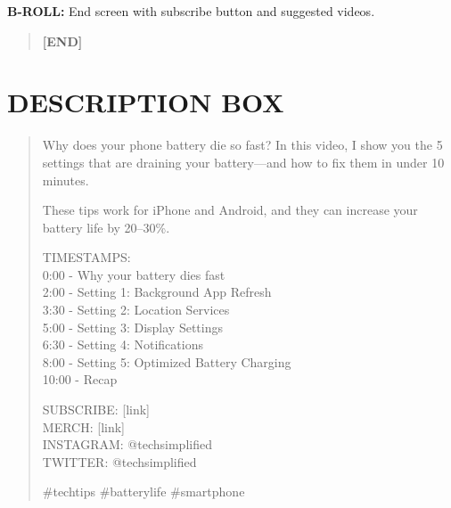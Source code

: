 \documentclass[
    language=english,
    doctype=video-script,
    institution=none,
]{../../omnilatex}
\begin{document}
\textbf{B-ROLL:} End screen with subscribe button and suggested videos.

\begin{quote}
\textbf{[END]}
\end{quote}

\section*{DESCRIPTION BOX}

\begin{quote}
Why does your phone battery die so fast? In this video, I show you the 5 settings that are draining your battery---and how to fix them in under 10 minutes.

These tips work for iPhone and Android, and they can increase your battery life by 20--30\%.

TIMESTAMPS:\\
0:00 - Why your battery dies fast\\
2:00 - Setting 1: Background App Refresh\\
3:30 - Setting 2: Location Services\\
5:00 - Setting 3: Display Settings\\
6:30 - Setting 4: Notifications\\
8:00 - Setting 5: Optimized Battery Charging\\
10:00 - Recap

SUBSCRIBE: [link]\\
MERCH: [link]\\
INSTAGRAM: @techsimplified\\
TWITTER: @techsimplified

#techtips #batterylife #smartphone
\end{quote}
\end{document}
